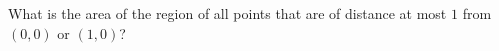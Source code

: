What is the area of the region of all points that are of distance at most $1$ from $(0, 0)$ or $(1, 0)$?
